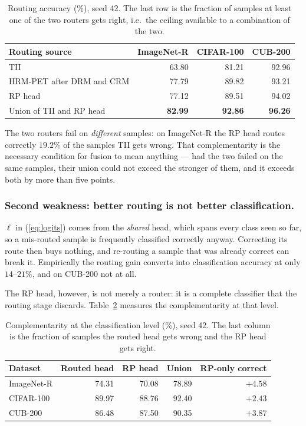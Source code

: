 \documentclass[runningheads]{llncs}
\begin{document}
\begin{table}
\caption{Routing accuracy (\%), seed 42. The last row is the fraction of samples
at least one of the two routers gets right, i.e.\ the ceiling available to a
combination of the two.}\label{tab:routing}
\begin{tabular}{lrrr}
\hline
Routing source & ImageNet-R & CIFAR-100 & CUB-200\\
\hline
TII                       & 63.80 & 81.21 & 92.96\\
HRM-PET after DRM and CRM & 77.79 & 89.82 & 93.21\\
RP head                   & 77.12 & 89.51 & 94.02\\
\hline
Union of TII and RP head  & \textbf{82.99} & \textbf{92.86} & \textbf{96.26}\\
\hline
\end{tabular}
\end{table}

The two routers fail on \emph{different} samples: on ImageNet-R the RP head
routes correctly $19.2\%$ of the samples TII gets wrong. That complementarity is
the necessary condition for fusion to mean anything --- had the two failed on
the same samples, their union could not exceed the stronger of them, and it
exceeds both by more than five points.

\subsubsection{Second weakness: better routing is not better classification.}
$\ell$ in (\ref{eq:logits}) comes from the \emph{shared} head, which spans every
class seen so far, so a mis-routed sample is frequently classified correctly
anyway. Correcting its route then buys nothing, and re-routing a sample that was
already correct can break it. Empirically the routing gain converts into
classification accuracy at only $14$--$21\%$, and on CUB-200 not at all.

The RP head, however, is not merely a router: it is a complete classifier that
the routing stage discards. Table~\ref{tab:cls} measures the complementarity at
that level.

\begin{table}
\caption{Complementarity at the classification level (\%), seed 42. The last
column is the fraction of samples the routed head gets wrong and the RP head
gets right.}\label{tab:cls}
\begin{tabular}{lrrrr}
\hline
Dataset & Routed head & RP head & Union & RP-only correct\\
\hline
ImageNet-R & 74.31 & 70.08 & 78.89 & $+4.58$\\
CIFAR-100  & 89.97 & 88.76 & 92.40 & $+2.43$\\
CUB-200    & 86.48 & 87.50 & 90.35 & $+3.87$\\
\hline
\end{tabular}
\end{table}
\end{document}
